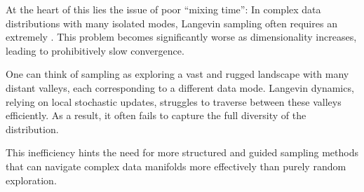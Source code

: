 At the heart of this  lies the issue of poor ``mixing time'': In complex data distributions with many isolated modes, Langevin sampling often requires an extremely . This problem becomes significantly worse as dimensionality increases, leading to prohibitively slow convergence.

One can think of sampling as exploring a vast and rugged landscape with many distant valleys, each corresponding to a different data mode. Langevin dynamics, relying on local stochastic updates, struggles to traverse between these valleys efficiently. As a result, it often fails to capture the full diversity of the distribution.

This inefficiency hints the need for more structured and guided sampling methods that can navigate complex data manifolds more effectively than purely random exploration.









\clearpage
\newpage



